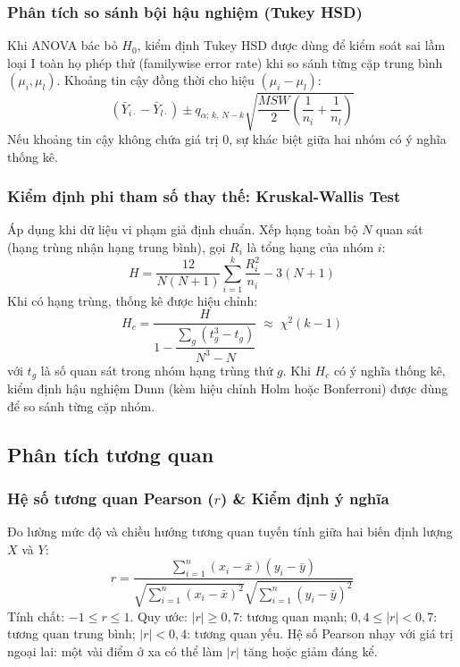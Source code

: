 \documentclass[12pt,a4paper]{article}
\newcommand{\xbar}{\bar{x}}
\begin{document}
\subsubsection{Phân tích so sánh bội hậu nghiệm (Tukey HSD)}

Khi ANOVA bác bỏ $H_0$, kiểm định Tukey HSD được dùng để kiểm soát sai lầm loại I toàn họ phép
thử (familywise error rate) khi so sánh từng cặp trung bình $(\mu_i, \mu_l)$. Khoảng tin cậy đồng
thời cho hiệu $(\mu_i - \mu_l)$:
\begin{equation}
  (\bar{Y}_{i\cdot} - \bar{Y}_{l\cdot}) \pm q_{\alpha;\,k,\,N-k}
  \sqrt{\frac{MSW}{2}\left(\frac{1}{n_i}+\frac{1}{n_l}\right)}
\end{equation}
Nếu khoảng tin cậy không chứa giá trị 0, sự khác biệt giữa hai nhóm có ý nghĩa thống kê.

\subsubsection{Kiểm định phi tham số thay thế: Kruskal-Wallis Test}

Áp dụng khi dữ liệu vi phạm giả định chuẩn. Xếp hạng toàn bộ $N$ quan sát (hạng trùng nhận hạng
trung bình), gọi $R_i$ là tổng hạng của nhóm $i$:
\begin{equation}
  H = \frac{12}{N(N+1)}\sum_{i=1}^{k}\frac{R_i^2}{n_i} - 3(N+1)
\end{equation}
Khi có hạng trùng, thống kê được hiệu chỉnh:
\begin{equation}
  H_{c} = \frac{H}{1 - \dfrac{\sum_{g}(t_g^3 - t_g)}{N^3 - N}} \;\approx\; \chi^2(k-1)
\end{equation}
với $t_g$ là số quan sát trong nhóm hạng trùng thứ $g$. Khi $H_c$ có ý nghĩa thống kê, kiểm
định hậu nghiệm Dunn (kèm hiệu chỉnh Holm hoặc Bonferroni) được dùng để so sánh từng cặp nhóm.

\subsection{Phân tích tương quan}

\subsubsection{Hệ số tương quan Pearson ($r$) \& Kiểm định ý nghĩa}

Đo lường mức độ và chiều hướng tương quan tuyến tính giữa hai biến định lượng $X$ và $Y$:
\begin{equation}
  r = \frac{\sum_{i=1}^{n}(x_i - \xbar)(y_i - \bar{y})}
           {\sqrt{\sum_{i=1}^{n}(x_i - \xbar)^2}\sqrt{\sum_{i=1}^{n}(y_i - \bar{y})^2}}
\end{equation}
Tính chất: $-1 \le r \le 1$. Quy ước: $|r| \ge 0{,}7$: tương quan mạnh;
$0{,}4 \le |r| < 0{,}7$: tương quan trung bình; $|r| < 0{,}4$: tương quan yếu.
Hệ số Pearson nhạy với giá trị ngoại lai: một vài điểm ở xa có thể làm $|r|$ tăng hoặc giảm
đáng kể.
\end{document}
